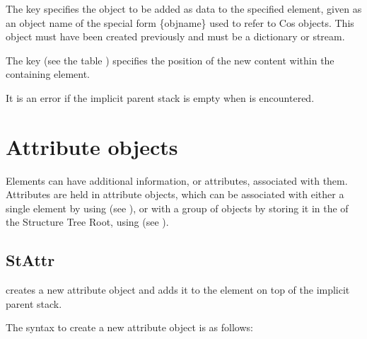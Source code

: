 \documentclass[letterpaper,12pt,english,openany,oneside]{sphinxmanual}
\begin{document}
\begin{sphinxVerbatim}[commandchars=\\\{\}]
 \PYG{p}{[}  
\PYG{p}{[}            
\PYG{p}{[} 
         
\end{sphinxVerbatim}

The  key specifies the object to be added as data to the specified element, given as an object name of the special form \{objname\} used to refer to Cos objects. This object must have been created previously and must be a dictionary or stream.

The  key (see the table ) specifies the position of the new content within the containing element.

It is an error if the implicit parent stack is empty when  is encountered.


\section{Attribute objects}
\label{\detokenize{pdfmark_Logical:attribute-objects}}
Elements can have additional information, or attributes, associated with them. Attributes are held in attribute objects, which can be associated with either a single element by using  (see ), or with a group of objects by storing it in the  of the Structure Tree Root, using  (see ).


\subsection{StAttr}
\label{\detokenize{pdfmark_Logical:stattr}}
 creates a new attribute object and adds it to the element on top of the implicit parent stack.

The syntax to create a new attribute object is as follows:

\begin{sphinxVerbatim}[commandchars=\\\{\}]
 \PYG{p}{[}  

         
\end{sphinxVerbatim}
\end{document}
